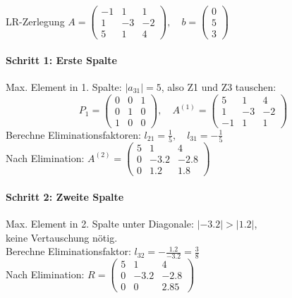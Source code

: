 \begin{example2}[breakable]{LR-Zerlegung}
$A = \begin{pmatrix}
-1 & 1 & 1\\
1 & -3 & -2\\
5 & 1 & 4
\end{pmatrix}, \quad b = \begin{pmatrix}
0\\
5\\
3
\end{pmatrix}$

\paragraph{Schritt 1: Erste Spalte}
Max. Element in 1. Spalte: $|a_{31}| = 5$, also Z1 und Z3 tauschen:
$$P_1 = \begin{pmatrix}
0 & 0 & 1\\
0 & 1 & 0\\
1 & 0 & 0
\end{pmatrix}, \quad A^{(1)} = \begin{pmatrix}
5 & 1 & 4\\
1 & -3 & -2\\
-1 & 1 & 1
\end{pmatrix}$$
Berechne Eliminationsfaktoren:
$l_{21} = \frac{1}{5}, \quad l_{31} = -\frac{1}{5}$
\vspace{2mm}\\
Nach Elimination:
$A^{(2)} = \begin{pmatrix}
5 & 1 & 4\\
0 & -3.2 & -2.8\\
0 & 1.2 & 1.8
\end{pmatrix}$

\paragraph{Schritt 2: Zweite Spalte}
Max. Element in 2. Spalte unter Diagonale: $|-3.2| > |1.2|$, \\ keine Vertauschung nötig.
\vspace{2mm}\\
Berechne Eliminationsfaktor:
$l_{32} = -\frac{1.2}{-3.2} = \frac{3}{8}$
\vspace{2mm}\\
Nach Elimination:
$R = \begin{pmatrix}
5 & 1 & 4\\
0 & -3.2 & -2.8\\
0 & 0 & 2.85
\end{pmatrix}$


\end{example2}
